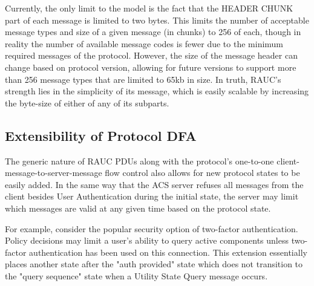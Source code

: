 \documentclass{article}
\begin{document}
Currently, the only limit to the model is the fact that the HEADER CHUNK part of each message is limited to two bytes. This limits the number of acceptable message types and size of a given message (in chunks) to 256 of each, though in reality the number of available message codes is fewer due to the minimum required messages of the protocol. However, the size of the message header can change based on protocol version, allowing for future versions to support more than 256 message types that are limited to 65kb in size. In truth,  RAUC's strength lies in the simplicity of its message, which is easily scalable by increasing the byte-size of either of any of its subparts. 

\subsection{Extensibility of Protocol DFA}
The generic nature of RAUC PDUs along with the protocol's one-to-one client-message-to-server-message flow control also allows for new protocol states to be easily added. In the same way that the ACS server refuses all messages from the client besides User Authentication during the initial state, the server may limit which messages are valid at any given time based on the protocol state. 

For example, consider the popular security option of two-factor authentication. Policy decisions may limit a user's ability to query active components unless two-factor authentication has been used on this connection. This extension essentially places another state after the "auth provided" state which does not transition to the "query sequence" state when a Utility State Query message occurs.
\end{document}

